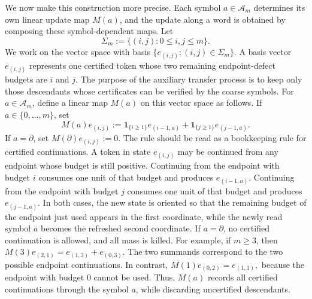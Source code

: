 \documentclass[11pt]{amsart}
\numberwithin{equation}{section}
\theoremstyle{plain}
\theoremstyle{definition}
\theoremstyle{remark}
\begin{document}
We now make this construction more precise. Each symbol \(a\in\mathcal A_m\) determines its own linear update map \(M(a)\), and the update along a word is obtained by composing these symbol-dependent maps.  
Let
\[
\Sigma_m:=\{(i,j):0\le i,j\le m\}.
\]
We work on the vector space with basis \(\{e_{(i,j)}:(i,j)\in\Sigma_m\}\). A
basis vector \(e_{(i,j)}\) represents one certified token whose two remaining
endpoint-defect budgets are \(i\) and \(j\). The purpose of the auxiliary
transfer process is to keep only those descendants whose certificates can be verified by
the coarse symbols.
For \(a\in\mathcal A_m\), define a linear map \(M(a)\) on this vector space as
follows. If \(a\in\{0,\dots,m\}\), set
\[
M(a)e_{(i,j)}
:=
\mathbf 1_{\{i\ge1\}}e_{(i-1,a)}
+
\mathbf 1_{\{j\ge1\}}e_{(j-1,a)}.
\]
If \(a=\partial\), set \(M(\partial)e_{(i,j)}:=0\). The rule should be read as
a bookkeeping rule for certified continuations. A token in state \(e_{(i,j)}\)
may be continued from any endpoint whose budget is still positive. Continuing
from the endpoint with budget \(i\) consumes one unit of that budget and produces
\(e_{(i-1,a)}\). Continuing from the endpoint with budget \(j\) consumes one
unit of that budget and produces \(e_{(j-1,a)}\). In both cases, the new state is
oriented so that the remaining budget of the endpoint just used appears in the
first coordinate, while the newly read symbol \(a\) becomes the refreshed second
coordinate. If \(a=\partial\), no certified continuation is allowed, and all
mass is killed.
For example, if \(m\ge3\), then
\(
M(3)e_{(2,1)}=e_{(1,3)}+e_{(0,3)}.
\)
The two summands correspond to the two possible endpoint continuations. In
contrast,
\(
M(1)e_{(0,2)}=e_{(1,1)},
\)
because the endpoint with budget \(0\) cannot be used. Thus, \(M(a)\) records
all certified continuations through the symbol \(a\), while discarding
uncertified descendants.
\end{document}
